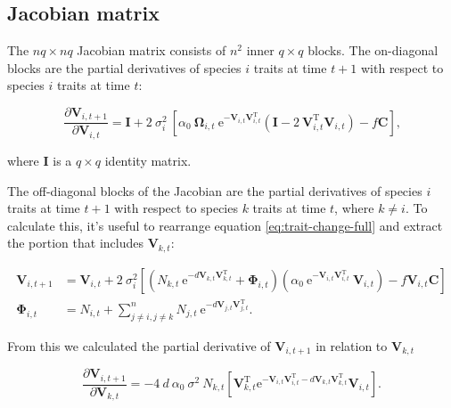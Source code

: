 \subsection*{Jacobian matrix}

The $nq \times nq$ Jacobian matrix consists of $n^2$ inner $q \times q$ blocks.
The on-diagonal blocks are the partial derivatives of species $i$ traits at time $t+1$ with respect
to species $i$ traits at time $t$:

$$
    \frac{ \partial \mathbf{V}_{i,t+1} }{ \partial \mathbf{V}_{i,t} } = \mathbf{I} + 2 ~ \sigma_i^2 ~
        \left[
            \alpha_0 ~ \mathbf{\Omega}_{i,t} ~ \textrm{e}^{ - \mathbf{V}_{i,t} \mathbf{V}_{i,t}^{\textrm{T}} }
            \left(
                \mathbf{I} - 2 ~ \mathbf{V}_{i,t}^{\textrm{T}} \mathbf{V}_{i,t}
            \right) -
            f \mathbf{C}
        \right]
    \textrm{,}
$$

\noindent where $\mathbf{I}$ is a $q \times q$ identity matrix.


The off-diagonal blocks of the Jacobian are the partial derivatives of species $i$
traits at time $t+1$ with respect to species $k$ traits at time $t$, where $k \ne i$.
To calculate this, it's useful to rearrange equation \ref{eq:trait-change-full} and 
extract the portion that includes $\mathbf{V}_{k,t}$:

\begin{equation*}
\begin{split}
    \mathbf{V}_{i,t+1} &= \mathbf{V}_{i,t} + 2 ~ \sigma_i^2
    \left[
        \left(
            N_{k,t} ~ \textrm{e}^{-d \mathbf{V}_{k,t} \mathbf{V}_{k,t}^\textrm{T}} +
            \mathbf{\Phi}_{i,t}
        \right)
        \left(
            \alpha_0 ~ \textrm{e}^{-\mathbf{V}_{i,t}
            \mathbf{V}_{i,t}^\textrm{T}} ~ \mathbf{V}_{i,t}
        \right)
        - f \mathbf{V}_{i,t} \mathbf{C}
    \right] \\
    \mathbf{\Phi}_{i,t} &= N_{i,t} + \sum_{j \ne i, j \ne k}^{n}{
        N_{j,t} ~ \textrm{e}^{-d \mathbf{V}_{j,t}
        \mathbf{V}_{j,t}^{\textrm{T}}} }
    \textrm{.}
\end{split}
\end{equation*}

From this we calculated the partial derivative of $\mathbf{V}_{i,t+1}$ in relation to $\mathbf{V}_{k,t}$

$$
    \frac{ \partial\mathbf{V}_{i,t+1} }{ \partial\mathbf{V}_{k,t}} =
        -4 ~ d ~ \alpha_0 ~ \sigma^2 ~ N_{k,t}
        \left[
            \mathbf{V}_{k,t}^{\textrm{T}}
            \textrm{e}^{
                - \mathbf{V}_{i,t} \mathbf{V}_{i,t}^{\textrm{T}}
                - d \mathbf{V}_{k,t} \mathbf{V}_{k,t}^{\textrm{T}}
            }
            \mathbf{V}_{i,t}
        \right]
    \textrm{.}
$$


